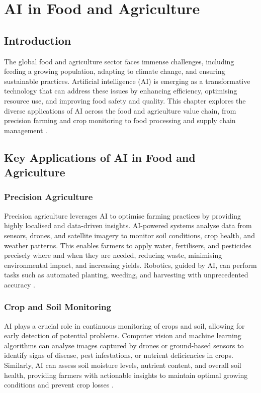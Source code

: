 \chapter{AI in Food and Agriculture}
\label{cha:ai_in_food_and_agriculture}

\section{Introduction}

The global food and agriculture sector faces immense challenges, including feeding a growing population, adapting to climate change, and ensuring sustainable practices. Artificial intelligence (AI) is emerging as a transformative technology that can address these issues by enhancing efficiency, optimising resource use, and improving food safety and quality. This chapter explores the diverse applications of AI across the food and agriculture value chain, from precision farming and crop monitoring to food processing and supply chain management \parencite{kumar2025reviewai}.

\section{Key Applications of AI in Food and Agriculture}

\subsection{Precision Agriculture}

Precision agriculture leverages AI to optimise farming practices by providing highly localised and data-driven insights. AI-powered systems analyse data from sensors, drones, and satellite imagery to monitor soil conditions, crop health, and weather patterns. This enables farmers to apply water, fertilisers, and pesticides precisely where and when they are needed, reducing waste, minimising environmental impact, and increasing yields. Robotics, guided by AI, can perform tasks such as automated planting, weeding, and harvesting with unprecedented accuracy \parencite{subedi2023ai}.

\subsection{Crop and Soil Monitoring}

AI plays a crucial role in continuous monitoring of crops and soil, allowing for early detection of potential problems. Computer vision and machine learning algorithms can analyse images captured by drones or ground-based sensors to identify signs of disease, pest infestations, or nutrient deficiencies in crops. Similarly, AI can assess soil moisture levels, nutrient content, and overall soil health, providing farmers with actionable insights to maintain optimal growing conditions and prevent crop losses \parencite{singh2024artificial}.

